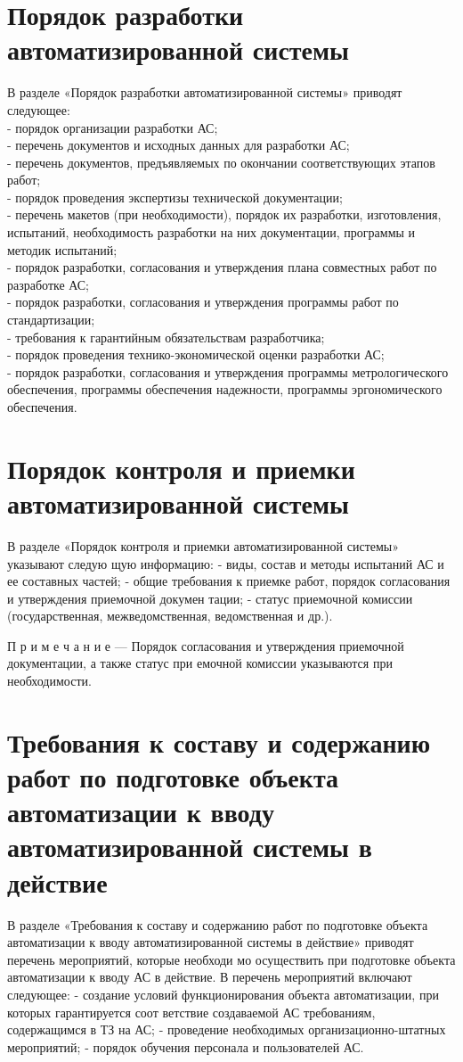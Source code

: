 {\section{Порядок разработки автоматизированной системы}
В разделе «Порядок разработки автоматизированной системы» приводят следующее:\\
- порядок организации разработки АС;\\
- перечень документов и исходных данных для разработки АС;\\
- перечень документов, предъявляемых по окончании соответствующих этапов работ;\\
- порядок проведения экспертизы технической документации;\\
- перечень макетов (при необходимости), порядок их разработки, изготовления, испытаний, необходимость разработки на них документации, программы и методик испытаний;\\
- порядок разработки, согласования и утверждения плана совместных работ по разработке АС;\\
- порядок разработки, согласования и утверждения программы работ по стандартизации;\\
- требования к гарантийным обязательствам разработчика;\\
- порядок проведения технико-экономической оценки разработки АС;\\
- порядок разработки, согласования и утверждения программы метрологического обеспечения, программы обеспечения надежности, программы эргономического обеспечения.\\

\section{Порядок контроля и приемки автоматизированной системы}
В разделе «Порядок контроля и приемки автоматизированной системы» указывают следую
щую информацию:
- виды, состав и методы испытаний АС и ее составных частей;
- общие требования к приемке работ, порядок согласования и утверждения приемочной докумен
тации;
- статус приемочной комиссии (государственная, межведомственная, ведомственная и др.).

П р и м е ч а н и е — Порядок согласования и утверждения приемочной документации, а также статус при
емочной комиссии указываются при необходимости.

\section{Требования к составу и содержанию работ по подготовке объекта автоматизации
к вводу автоматизированной системы в действие}
В разделе «Требования к составу и содержанию работ по подготовке объекта автоматизации
к вводу автоматизированной системы в действие» приводят перечень мероприятий, которые необходи
мо осуществить при подготовке объекта автоматизации к вводу АС в действие.
В перечень мероприятий включают следующее:
- создание условий функционирования объекта автоматизации, при которых гарантируется соот
ветствие создаваемой АС требованиям, содержащимся в ТЗ на АС;
- проведение необходимых организационно-штатных мероприятий;
- порядок обучения персонала и пользователей АС.

}
